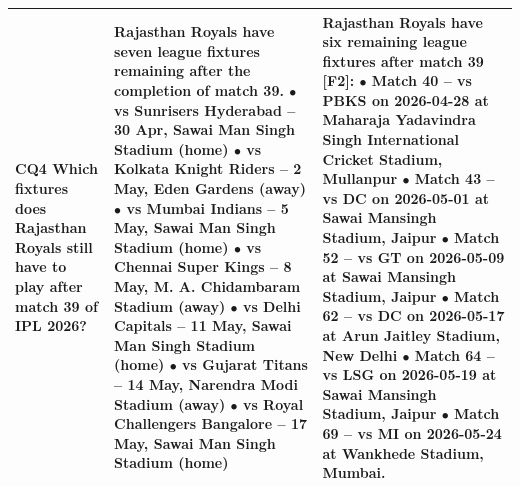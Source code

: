 \begin{longtable}{p{1.9cm}p{6.8cm}p{6.8cm}}
\textbf{CQ4} \newline \scriptsize Which fixtures does Rajasthan Royals still have to play after match 39 of IPL 2026? & \scriptsize Rajasthan Royals have seven league fixtures remaining after the completion of match 39. \newline \quad$\bullet$ vs Sunrisers Hyderabad -- 30 Apr, Sawai Man Singh Stadium (home) \newline \quad$\bullet$ vs Kolkata Knight Riders -- 2 May, Eden Gardens (away) \newline \quad$\bullet$ vs Mumbai Indians -- 5 May, Sawai Man Singh Stadium (home) \newline \quad$\bullet$ vs Chennai Super Kings -- 8 May, M. A. Chidambaram Stadium (away) \newline \quad$\bullet$ vs Delhi Capitals -- 11 May, Sawai Man Singh Stadium (home) \newline \quad$\bullet$ vs Gujarat Titans -- 14 May, Narendra Modi Stadium (away) \newline \quad$\bullet$ vs Royal Challengers Bangalore -- 17 May, Sawai Man Singh Stadium (home) & \scriptsize Rajasthan Royals have six remaining league fixtures after match 39 \textsf{[F2]}: \newline \quad$\bullet$ Match 40 -- vs PBKS on 2026-04-28 at Maharaja Yadavindra Singh International Cricket Stadium, Mullanpur \newline \quad$\bullet$ Match 43 -- vs DC on 2026-05-01 at Sawai Mansingh Stadium, Jaipur \newline \quad$\bullet$ Match 52 -- vs GT on 2026-05-09 at Sawai Mansingh Stadium, Jaipur \newline \quad$\bullet$ Match 62 -- vs DC on 2026-05-17 at Arun Jaitley Stadium, New Delhi \newline \quad$\bullet$ Match 64 -- vs LSG on 2026-05-19 at Sawai Mansingh Stadium, Jaipur \newline \quad$\bullet$ Match 69 -- vs MI on 2026-05-24 at Wankhede Stadium, Mumbai. \\ \midrule

\end{longtable}
